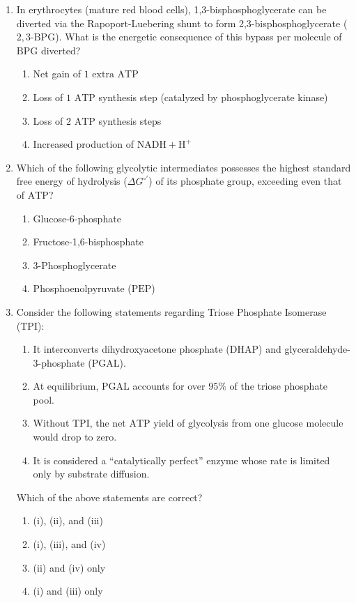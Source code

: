 \documentclass[11pt, a4paper]{article}
\begin{document}
\begin{enumerate}[label=\textbf{\arabic*.}]
\item In erythrocytes (mature red blood cells), 1,3-bisphosphoglycerate can be diverted via the Rapoport-Luebering shunt to form 2,3-bisphosphoglycerate ($2,3\text{-BPG}$). What is the energetic consequence of this bypass per molecule of $\text{BPG}$ diverted?
\begin{enumerate}[label=(\Alph*)]
    \item Net gain of $1\text{ extra ATP}$
    \item Loss of $1\text{ ATP}$ synthesis step (catalyzed by phosphoglycerate kinase)
    \item Loss of $2\text{ ATP}$ synthesis steps
    \item Increased production of $\text{NADH} + \text{H}^+$
\end{enumerate}

\item Which of the following glycolytic intermediates possesses the highest standard free energy of hydrolysis ($\Delta G^{\circ\prime}$) of its phosphate group, exceeding even that of $\text{ATP}$?
\begin{enumerate}[label=(\Alph*)]
    \item Glucose-6-phosphate
    \item Fructose-1,6-bisphosphate
    \item 3-Phosphoglycerate
    \item Phosphoenolpyruvate ($\text{PEP}$)
\end{enumerate}

\item Consider the following statements regarding Triose Phosphate Isomerase (TPI):
\begin{enumerate}[label=(\roman*)]
    \item It interconverts dihydroxyacetone phosphate ($\text{DHAP}$) and glyceraldehyde-3-phosphate ($\text{PGAL}$).
    \item At equilibrium, $\text{PGAL}$ accounts for over $95\%$ of the triose phosphate pool.
    \item Without TPI, the net $\text{ATP}$ yield of glycolysis from one glucose molecule would drop to zero.
    \item It is considered a ``catalytically perfect'' enzyme whose rate is limited only by substrate diffusion.
\end{enumerate}
Which of the above statements are correct?
\begin{enumerate}[label=(\Alph*)]
    \item (i), (ii), and (iii)
    \item (i), (iii), and (iv)
    \item (ii) and (iv) only
    \item (i) and (iii) only
\end{enumerate}


\end{enumerate}
\end{document}
